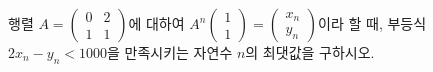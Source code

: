 \hspace*{2mm}\begin{minipage}[t]{\dimexpr\linewidth-2mm\relax}\vspace{0pt}
행렬 $A=\begin{pmatrix} 0 & 2 \\ 1 & 1 \end{pmatrix}$에 대하여 $A^n\begin{pmatrix} 1 \\ 1 \end{pmatrix}=\begin{pmatrix} x_n \\ y_n \end{pmatrix}$이라 할 때, 부등식 $2x_n-y_n<1000$을 만족시키는 자연수 $n$의 최댓값을 구하시오.\end{minipage}
